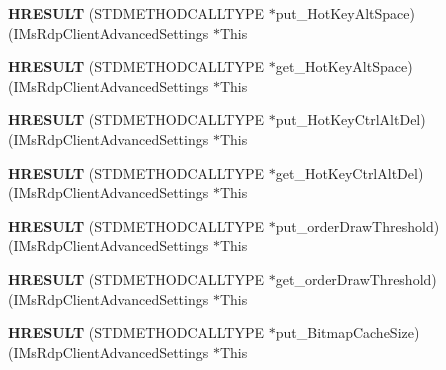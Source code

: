 \begin{DoxyCompactItemize}
{\bfseries H\+R\+E\+S\+U\+LT} (S\+T\+D\+M\+E\+T\+H\+O\+D\+C\+A\+L\+L\+T\+Y\+PE $\ast$put\+\_\+\+Hot\+Key\+Alt\+Space)(I\+Ms\+Rdp\+Client\+Advanced\+Settings $\ast$This
\item 
\mbox{\label{struct_i_ms_rdp_client_advanced_settings_vtbl_a38f9ff7954c82c431137c867f31f27c8}} 
{\bfseries H\+R\+E\+S\+U\+LT} (S\+T\+D\+M\+E\+T\+H\+O\+D\+C\+A\+L\+L\+T\+Y\+PE $\ast$get\+\_\+\+Hot\+Key\+Alt\+Space)(I\+Ms\+Rdp\+Client\+Advanced\+Settings $\ast$This
\item 
\mbox{\label{struct_i_ms_rdp_client_advanced_settings_vtbl_a2e2b2f6ced20393f0a0db5019e826413}} 
{\bfseries H\+R\+E\+S\+U\+LT} (S\+T\+D\+M\+E\+T\+H\+O\+D\+C\+A\+L\+L\+T\+Y\+PE $\ast$put\+\_\+\+Hot\+Key\+Ctrl\+Alt\+Del)(I\+Ms\+Rdp\+Client\+Advanced\+Settings $\ast$This
\item 
\mbox{\label{struct_i_ms_rdp_client_advanced_settings_vtbl_a0457f6e4cb45f994035da6d0faadb924}} 
{\bfseries H\+R\+E\+S\+U\+LT} (S\+T\+D\+M\+E\+T\+H\+O\+D\+C\+A\+L\+L\+T\+Y\+PE $\ast$get\+\_\+\+Hot\+Key\+Ctrl\+Alt\+Del)(I\+Ms\+Rdp\+Client\+Advanced\+Settings $\ast$This
\item 
\mbox{\label{struct_i_ms_rdp_client_advanced_settings_vtbl_ae1077f3a9dc18a3b89a615530a6fd623}} 
{\bfseries H\+R\+E\+S\+U\+LT} (S\+T\+D\+M\+E\+T\+H\+O\+D\+C\+A\+L\+L\+T\+Y\+PE $\ast$put\+\_\+order\+Draw\+Threshold)(I\+Ms\+Rdp\+Client\+Advanced\+Settings $\ast$This
\item 
\mbox{\label{struct_i_ms_rdp_client_advanced_settings_vtbl_a30ec9be6de3fc21b1aae0d604b9bdb37}} 
{\bfseries H\+R\+E\+S\+U\+LT} (S\+T\+D\+M\+E\+T\+H\+O\+D\+C\+A\+L\+L\+T\+Y\+PE $\ast$get\+\_\+order\+Draw\+Threshold)(I\+Ms\+Rdp\+Client\+Advanced\+Settings $\ast$This
\item 
\mbox{\label{struct_i_ms_rdp_client_advanced_settings_vtbl_a25ac5c7275a97ee257743b6185cb9828}} 
{\bfseries H\+R\+E\+S\+U\+LT} (S\+T\+D\+M\+E\+T\+H\+O\+D\+C\+A\+L\+L\+T\+Y\+PE $\ast$put\+\_\+\+Bitmap\+Cache\+Size)(I\+Ms\+Rdp\+Client\+Advanced\+Settings $\ast$This
\item 

\end{DoxyCompactItemize}
